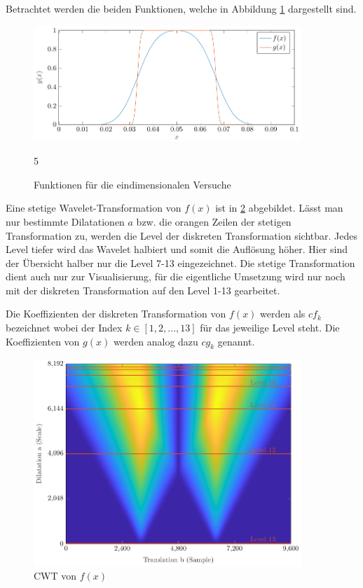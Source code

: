 Betrachtet werden die beiden Funktionen, welche in Abbildung \ref{deconvolve:1d} dargestellt sind.
\begin{figure}[h]
\centering
\includegraphics[width=0.9\textwidth]{./papers/deconvolve/pictures/1d.pdf}
\caption{Funktionen für die eindimensionalen Versuche\label{deconvolve:1d}}5
\end{figure}
Eine stetige Wavelet-Transformation von $f(x)$ ist in \ref{deconvolve:y1_cwt} abgebildet.
Lässt man nur bestimmte Dilatationen $a$ bzw. die orangen \glqq Zeilen\grqq{} der stetigen Transformation zu, werden die Level der diskreten Transformation sichtbar.
Jedes Level tiefer wird das Wavelet \glqq halbiert\grqq{} und somit die Auflösung höher.
Hier sind der Übersicht halber nur die Level 7-13 eingezeichnet. 
Die stetige Transformation dient auch nur zur Visualisierung, für die eigentliche Umsetzung wird nur noch mit der diskreten Transformation auf den Level 1-13 gearbeitet.

Die Koeffizienten der diskreten Transformation von $f(x)$ werden als $cf_k$ bezeichnet wobei der Index $k\in[1,2,...,13]$ für das jeweilige Level steht.
Die Koeffizienten von $g(x)$ werden analog dazu $cg_k$ genannt.
\begin{figure}[h]
\centering
\includegraphics[width=0.9\textwidth]{./papers/deconvolve/pictures/y1_cwt.pdf}
\caption{CWT von $f(x)$\label{deconvolve:y1_cwt}}
\end{figure}


